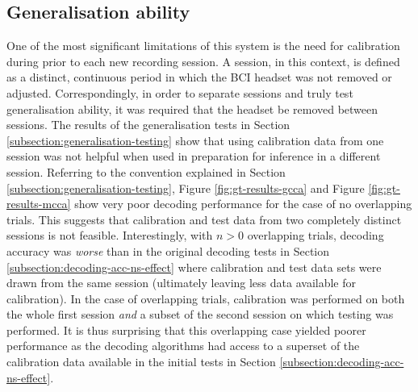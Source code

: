 \subsection{Generalisation ability}
\label{subsection:generaliation-discussion}
One of the most significant limitations of this system is the need for calibration during prior to each new recording session. A session, in this context, is defined as a distinct, continuous period in which the BCI headset was not removed or adjusted. Correspondingly, in order to separate sessions and truly test generalisation ability, it was required that the headset be removed between sessions. The results of the generalisation tests in Section \ref{subsection:generalisation-testing} show that using calibration data from one session was not helpful when used in preparation for inference in a different session. Referring to the convention explained in Section \ref{subsection:generalisation-testing}, Figure \ref{fig:gt-results-gcca} and Figure \ref{fig:gt-results-mcca} show very poor decoding performance for the case of no overlapping trials. This suggests that calibration and test data from two completely distinct sessions is not feasible. Interestingly, with $n>0$ overlapping trials, decoding accuracy was \textit{worse} than in the original decoding tests in Section \ref{subsection:decoding-acc-ns-effect} where calibration and test data sets were drawn from the same session (ultimately leaving less data available for calibration). In the case of overlapping trials, calibration was performed on both the whole first session \textit{and} a subset of the second session on which testing was performed. It is thus surprising that this overlapping case yielded poorer performance as the decoding algorithms had access to a superset of the calibration data available in the initial tests in Section \ref{subsection:decoding-acc-ns-effect}. 

